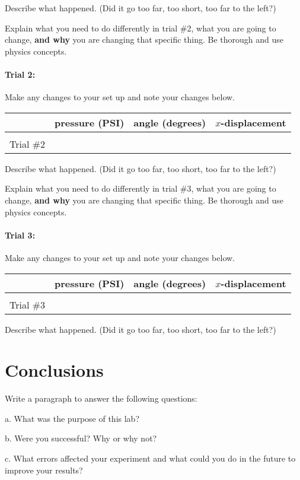 \documentclass[10pt]{exam}
\begin{document}
\noindent
Describe what happened. (Did it go too far, too short, too far to the left?)
\vs

\noindent
Explain what you need to do differently in trial \#2, what you are going to change, {\bf and why} you are changing that specific thing.  Be thorough and use physics concepts.
\vs


\paragraph{Trial 2:}  Make any changes to your set up and note your changes below.

\noindent
\begin{tabular}{|*4{l|}}
  \hline
  & pressure (PSI) & angle (degrees) & $x$-displacement\\\hline
  &&& \\
  Trial \#2 &&& \\
  \hline
\end{tabular}

\noindent
Describe what happened. (Did it go too far, too short, too far to the left?)
\vs

\noindent
Explain what you need to do differently in trial \#3, what you are going to change, {\bf and why} you are changing that specific thing.  Be thorough and use physics concepts.
\vs

\pagebreak

\paragraph{Trial 3:}  Make any changes to your set up and note your changes below.

\noindent
\begin{tabular}{|*4{l|}}
  \hline
  & pressure (PSI) & angle (degrees) & $x$-displacement\\\hline
  &&& \\
  Trial \#3 &&& \\
  \hline
\end{tabular}

\noindent
Describe what happened. (Did it go too far, too short, too far to the left?)
\vspace{5em}
			
\section*{Conclusions}
Write a paragraph to answer the following questions:

a.	What was the purpose of this lab? 

b.	Were you successful?  Why or why not? 

c.	What errors affected your experiment and what could you do in the future to improve your results?
\end{document}
